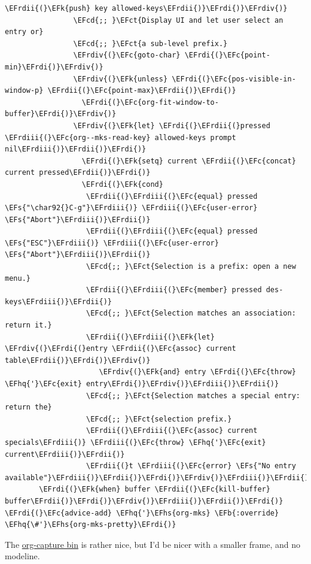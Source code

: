 \documentclass{scrartcl}
\newcommand{\EFk}[1]{\textcolor{EFk}{#1}} %
\newcommand{\EFs}[1]{\textcolor{EFs}{#1}} %
\newcommand{\EFb}[1]{\textcolor{EFb}{#1}} %
\newcommand{\EFct}[1]{\textcolor{EFct}{#1}} %
\newcommand{\EFc}[1]{\textcolor{EFc}{#1}} %
\newcommand{\EFcd}[1]{\textcolor{EFcd}{#1}} %
\newcommand{\EFhq}[1]{\textcolor{EFhq}{#1}} %
\newcommand{\EFhs}[1]{\textcolor{EFhs}{#1}} %
\newcommand{\EFrdi}[1]{\textcolor{EFrdi}{#1}} %
\newcommand{\EFrdii}[1]{\textcolor{EFrdii}{#1}} %
\newcommand{\EFrdiii}[1]{\textcolor{EFrdiii}{#1}} %
\newcommand{\EFrdiv}[1]{\textcolor{EFrdiv}{#1}} %
\begin{document}
\begin{Code}
\begin{Verbatim}[]
                    \EFrdii{(}\EFk{push} key allowed-keys\EFrdii{)}\EFrdi{)}\EFrdiv{)}
                \EFcd{;; }\EFct{Display UI and let user select an entry or}
                \EFcd{;; }\EFct{a sub-level prefix.}
                \EFrdiv{(}\EFc{goto-char} \EFrdi{(}\EFc{point-min}\EFrdi{)}\EFrdiv{)}
                \EFrdiv{(}\EFk{unless} \EFrdi{(}\EFc{pos-visible-in-window-p} \EFrdii{(}\EFc{point-max}\EFrdii{)}\EFrdi{)}
                  \EFrdi{(}\EFc{org-fit-window-to-buffer}\EFrdi{)}\EFrdiv{)}
                \EFrdiv{(}\EFk{let} \EFrdi{(}\EFrdii{(}pressed \EFrdiii{(}\EFc{org--mks-read-key} allowed-keys prompt nil\EFrdiii{)}\EFrdii{)}\EFrdi{)}
                  \EFrdi{(}\EFk{setq} current \EFrdii{(}\EFc{concat} current pressed\EFrdii{)}\EFrdi{)}
                  \EFrdi{(}\EFk{cond}
                   \EFrdii{(}\EFrdiii{(}\EFc{equal} pressed \EFs{"\char92{}C-g"}\EFrdiii{)} \EFrdiii{(}\EFc{user-error} \EFs{"Abort"}\EFrdiii{)}\EFrdii{)}
                   \EFrdii{(}\EFrdiii{(}\EFc{equal} pressed \EFs{"ESC"}\EFrdiii{)} \EFrdiii{(}\EFc{user-error} \EFs{"Abort"}\EFrdiii{)}\EFrdii{)}
                   \EFcd{;; }\EFct{Selection is a prefix: open a new menu.}
                   \EFrdii{(}\EFrdiii{(}\EFc{member} pressed des-keys\EFrdiii{)}\EFrdii{)}
                   \EFcd{;; }\EFct{Selection matches an association: return it.}
                   \EFrdii{(}\EFrdiii{(}\EFk{let} \EFrdiv{(}\EFrdi{(}entry \EFrdii{(}\EFc{assoc} current table\EFrdii{)}\EFrdi{)}\EFrdiv{)}
                      \EFrdiv{(}\EFk{and} entry \EFrdi{(}\EFc{throw} \EFhq{'}\EFc{exit} entry\EFrdi{)}\EFrdiv{)}\EFrdiii{)}\EFrdii{)}
                   \EFcd{;; }\EFct{Selection matches a special entry: return the}
                   \EFcd{;; }\EFct{selection prefix.}
                   \EFrdii{(}\EFrdiii{(}\EFc{assoc} current specials\EFrdiii{)} \EFrdiii{(}\EFc{throw} \EFhq{'}\EFc{exit} current\EFrdiii{)}\EFrdii{)}
                   \EFrdii{(}t \EFrdiii{(}\EFc{error} \EFs{"No entry available"}\EFrdiii{)}\EFrdii{)}\EFrdi{)}\EFrdiv{)}\EFrdiii{)}\EFrdii{)}\EFrdi{)}
        \EFrdi{(}\EFk{when} buffer \EFrdii{(}\EFc{kill-buffer} buffer\EFrdii{)}\EFrdi{)}\EFrdiv{)}\EFrdiii{)}\EFrdii{)}\EFrdi{)}
\EFrdi{(}\EFc{advice-add} \EFhq{'}\EFhs{org-mks} \EFb{:override} \EFhq{\#'}\EFhs{org-mks-pretty}\EFrdi{)}
\end{Verbatim}
\end{Code}

The \href{file:///Users/shauryasingh/.emacs.doom/bin/org-capture}{org-capture bin} is rather nice, but I'd be nicer with a smaller frame, and
no modeline.
\end{document}
